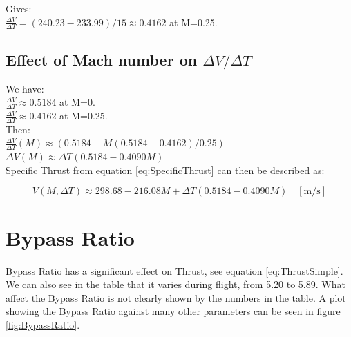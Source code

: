 \documentclass[english]{kththesis}
\begin{document}
Gives:\\

$\frac{\Delta V}{\Delta T}  =  (240.23-233.99)/15 \approx 0.4162 $ at M=0.25.\\




\subsection{Effect of Mach number on $\Delta V / \Delta T$}

We have:\\

$\frac{\Delta V}{\Delta T} \approx 0.5184 $ at M=0.\\

$\frac{\Delta V}{\Delta T} \approx 0.4162 $ at M=0.25.\\

Then:\\

$\frac{\Delta V}{\Delta T}(M) \approx (0.5184 - M (0.5184-0.4162)/0.25)$\\

$\Delta V(M) \approx  \Delta T (0.5184 - 0.4090M)$\\

Specific Thrust from equation \ref{eq:SpecificThrust} can then be described as:

\begin{equation}
\label{eq:SpecificThrust2}
V(M,\Delta T) \approx 298.68 - 216.08M + \Delta T (0.5184 - 0.4090M) \quad \mathrm{[m/s]}
\end{equation}


\section{Bypass Ratio}
Bypass Ratio has a significant effect on Thrust, see equation \ref{eq:ThrustSimple}. We can also see in the table that it varies during flight, from 5.20 to 5.89. What affect the Bypass Ratio is not clearly shown by the numbers in the table. A plot showing the Bypass Ratio against many other parameters can be seen in figure \ref{fig:BypassRatio}.
\end{document}
